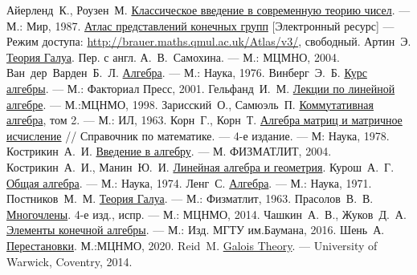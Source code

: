 \documentclass[11pt]{book}
\theoremstyle{mythm}
\theoremstyle{mydef}
\numberwithin{upr}{chapter}
\begin{document}
\begin{thebibliography}{199}
 Айерленд~К., Роузен~М. \href{http://ega-math.narod.ru/Books/Ireland.htm}{Классическое введение в современную теорию чисел}. --- М.: Мир, 1987.
 \href{http://brauer.maths.qmul.ac.uk/Atlas/v3/}{Атлас представлений конечных групп} [Электронный ресурс] --- Режим доступа: \href{http://brauer.maths.qmul.ac.uk/Atlas/v3/}{http://brauer.maths.qmul.ac.uk/Atlas/v3/}, свободный.
 Артин~Э. \href{https://1lib.eu/dl/441345/0526c3}{Теория Галуа}. Пер. с англ. А.~В.~Самохина. --- М.: МЦМНО, 2004.
 Ван~дер~Варден~Б.~Л. \href{https://obuchalka.org/2013070372271/algebra-van-der-varden-b-l.html}{Алгебра}. --- М.: Наука, 1976.
 Винберг~Э.~Б. \href{https://docs.google.com/viewer?a=v&pid=sites&srcid=ZGVmYXVsdGRvbWFpbnxraG1lbG5pdG1ldGF1YXxneDozMDhiMmU3NTg2MzJhNTY0}{Курс алгебры}. --- М.: Факториал Пресс, 2001.
 Гельфанд~И.~М. \href{https://obuchalka.org/2013062272049/lekcii-po-lineinoi-algebre-gelfand-i-m-1998.html}{Лекции по линейной алгебре}. --- М.:МЦНМО, 1998.
 Зарисский~О., Самюэль~П. \href{http://bookre.org/reader?file=1500259}{Коммутативная алгебра}, том 2. --- М.: ИЛ, 1963.
 Корн~Г., Корн~Т. \href{https://obuchalka.org/2012030563848/spravochnik-po-matematike-korn-g-korn-t-1973.html}{Алгебра матриц и матричное исчисление} // Справочник по математике. --- 4-е издание. --- М: Наука, 1978.
 Кострикин~А.~И. \href{https://obuchalka.org/2017012692830/vvedenie-v-algebru-chast-1-osnovi-algebri-kostrikin-a-i-2004.html}{Введение в алгебру}. --- М. ФИЗМАТЛИТ, 2004.
 Кострикин~А.~И., Манин~Ю.~И. \href{https://obuchalka.org/20100416367/lineinaya-algebra-i-geometriya-uchebnik-kostrikin-a-i-manin-u-i.html}{Линейная алгебра и геометрия}.
 Курош~А.~Г. \href{https://obuchalka.org/20100418381/obschaya-algebra-uchebnik-kurosh-a-g-1970.html}{Общая алгебра}. --- М.: Наука, 1974.
 Ленг~С. \href{https://obuchalka.org/2013070572293/algebra-leng-s.html}{Алгебра}. --- М.: Наука, 1971.
 Постников~М.~М. \href{https://1lib.eu/dl/706426/5cdc12}{Теория Галуа}. --- М.: Физматлит, 1963.
 Прасолов~В.~В. \href{ftp://ftp.mccme.ru/users/prasolov/polynoms/poly.pdf}{Многочлены}. 4-е изд., испр. --- М.: МЦНМО, 2014.
 Чашкин~А.~В., Жуков~Д.~А. \href{http://ebooks.bmstu.press/catalog/117/book1467.html}{Элементы конечной алгебры}. --- М.: Изд. МГТУ им.Баумана, 2016.
 Шень~А. \href{https://mccme.ru/shen/permutations.pdf}{Перестановки}. М.:МЦНМО, 2020.
 Reid~M. \href{https://homepages.warwick.ac.uk/~masda/MA3D5/Galois.pdf}{Galois Theory}. --- University of Warwick, Coventry, 2014.



\end{thebibliography}
\end{document}
